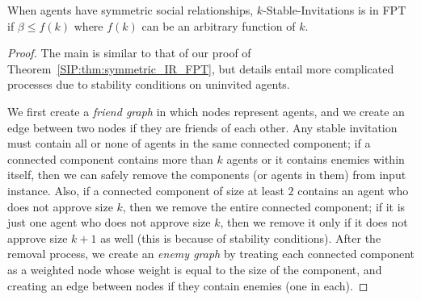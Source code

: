 \begin{theorem} \label{SIP:thm:symmetric_stable_FPT}
	When agents have symmetric social relationships, $k$-Stable-Invitations is in FPT if $\beta \leq f(k)$ where $f(k)$ can be an arbitrary function of $k$. 
\end{theorem}
\begin{proof}
	The main is similar to that of our proof of Theorem~\ref{SIP:thm:symmetric_IR_FPT}, but details entail more complicated processes due to stability conditions on uninvited agents.

	We first create a {\em friend graph} in which nodes represent agents, and we create an edge between two nodes if they are friends of each other. 
	Any stable invitation must contain all or none of agents in the same connected component; if a connected component contains more than $k$ agents or it contains enemies within itself, then we can safely remove the components (or agents in them) from input instance. 
	Also, if a connected component of size at least $2$ contains an agent who does not approve size $k$, then we remove the entire connected component; if it is just one agent who does not approve size $k$, then we remove it only if it does not approve size $k+1$ as well (this is because of stability conditions). 
	After the removal process, we create an {\em enemy graph} by treating each connected component as a weighted node whose weight is equal to the size of the component, and creating an edge between nodes if they contain enemies (one in each).
	

\end{proof}
